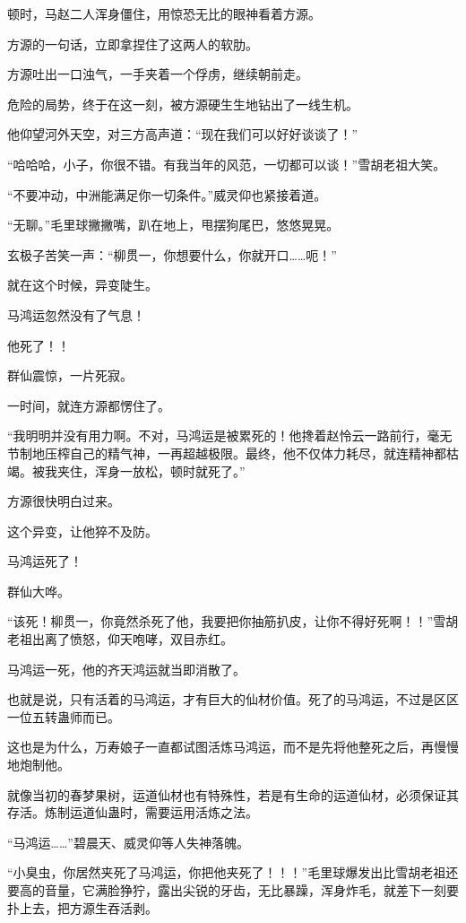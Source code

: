 \begin{this_body}
顿时，马赵二人浑身僵住，用惊恐无比的眼神看着方源。

方源的一句话，立即拿捏住了这两人的软肋。

方源吐出一口浊气，一手夹着一个俘虏，继续朝前走。

危险的局势，终于在这一刻，被方源硬生生地钻出了一线生机。

他仰望河外天空，对三方高声道：“现在我们可以好好谈谈了！”

“哈哈哈，小子，你很不错。有我当年的风范，一切都可以谈！”雪胡老祖大笑。

“不要冲动，中洲能满足你一切条件。”威灵仰也紧接着道。

“无聊。”毛里球撇撇嘴，趴在地上，甩摆狗尾巴，悠悠晃晃。

玄极子苦笑一声：“柳贯一，你想要什么，你就开口……呃！”

就在这个时候，异变陡生。

马鸿运忽然没有了气息！

他死了！！

群仙震惊，一片死寂。

一时间，就连方源都愣住了。

“我明明并没有用力啊。不对，马鸿运是被累死的！他搀着赵怜云一路前行，毫无节制地压榨自己的精气神，一再超越极限。最终，他不仅体力耗尽，就连精神都枯竭。被我夹住，浑身一放松，顿时就死了。”

方源很快明白过来。

这个异变，让他猝不及防。

马鸿运死了！

群仙大哗。

“该死！柳贯一，你竟然杀死了他，我要把你抽筋扒皮，让你不得好死啊！！”雪胡老祖出离了愤怒，仰天咆哮，双目赤红。

马鸿运一死，他的齐天鸿运就当即消散了。

也就是说，只有活着的马鸿运，才有巨大的仙材价值。死了的马鸿运，不过是区区一位五转蛊师而已。

这也是为什么，万寿娘子一直都试图活炼马鸿运，而不是先将他整死之后，再慢慢地炮制他。

就像当初的春梦果树，运道仙材也有特殊性，若是有生命的运道仙材，必须保证其存活。炼制运道仙蛊时，需要运用活炼之法。

“马鸿运……”碧晨天、威灵仰等人失神落魄。

“小臭虫，你居然夹死了马鸿运，你把他夹死了！！！”毛里球爆发出比雪胡老祖还要高的音量，它满脸狰狞，露出尖锐的牙齿，无比暴躁，浑身炸毛，就差下一刻要扑上去，把方源生吞活剥。


\end{this_body}
